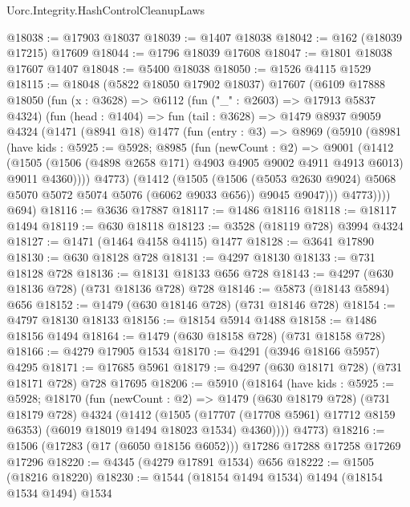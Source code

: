 \begin{lexlean}{Uorc.Integrity.HashControlCleanupLaws}
\begin{coremodule}
@18038 := @17903 @18037
@18039 := @1407 @18038
@18042 := @162 (@18039 @17215) @17609
@18044 := @1796 @18039 @17608
@18047 := @1801 @18038 @17607 @1407
@18048 := @5400 @18038
@18050 := @1526 @4115 @1529
@18115 := @18048
    (@5822 @18050 @17902 @18037)
    @17607
    (@6109
      @17888
      @18050
      (fun (x : @3628) =>
      @6112
        (fun ("_" : @2603) => @17913 @5837 @4324)
        (fun (head : @1404) =>
        fun (tail : @3628) =>
        @1479
          @8937
          @9059
          @4324
          (@1471
            (@8941 @18)
            @1477
            (fun (entry : @3) =>
            @8969
              (@5910
                (@8981
                  (have kids : @5925 := @5928;
                  @8985
                    (fun (newCount : @2) =>
                    @9001
                      (@1412
                        (@1505
                          (@1506 (@4898 @2658 @171) @4903 @4905 @9002 @4911 @4913 @6013)
                          @9011
                          @4360))))
                  @4773)
                (@1412
                  (@1505
                    (@1506 (@5053 @2630 @9024) @5068 @5070 @5072 @5074 @5076 (@6062 @9033 @656))
                    @9045
                    @9047)))
              @4773))))
      @694)
@18116 := @3636 @17887
@18117 := @1486 @18116
@18118 := @18117 @1494
@18119 := @630 @18118
@18123 := @3528 (@18119 @728) @3994 @4324
@18127 := @1471 (@1464 @4158 @4115) @1477
@18128 := @3641 @17890
@18130 := @630 @18128 @728
@18131 := @4297 @18130
@18133 := @731 @18128 @728
@18136 := @18131 @18133 @656 @728
@18143 := @4297 (@630 @18136 @728) (@731 @18136 @728) @728
@18146 := @5873 (@18143 @5894) @656
@18152 := @1479 (@630 @18146 @728) (@731 @18146 @728)
@18154 := @4797 @18130 @18133
@18156 := @18154 @5914 @1488
@18158 := @1486 @18156 @1494
@18164 := @1479 (@630 @18158 @728) (@731 @18158 @728)
@18166 := @4279 @17905 @1534
@18170 := @4291 (@3946 @18166 @5957) @4295
@18171 := @17685 @5961
@18179 := @4297 (@630 @18171 @728) (@731 @18171 @728) @728 @17695
@18206 := @5910
    (@18164
      (have kids : @5925 := @5928;
      @18170
        (fun (newCount : @2) =>
        @1479
          (@630 @18179 @728)
          (@731 @18179 @728)
          @4324
          (@1412
            (@1505
              (@17707 (@17708 @5961) @17712 @8159 @6353)
              (@6019 @18019 @1494 @18023 @1534)
              @4360))))
      @4773)
@18216 := @1506 (@17283 (@17 (@6050 @18156 @6052))) @17286 @17288 @17258 @17269 @17296
@18220 := @4345 (@4279 @17891 @1534) @656
@18222 := @1505 (@18216 @18220)
@18230 := @1544 (@18154 @1494 @1534) @1494 (@18154 @1534 @1494) @1534

\end{coremodule}
\end{lexlean}
